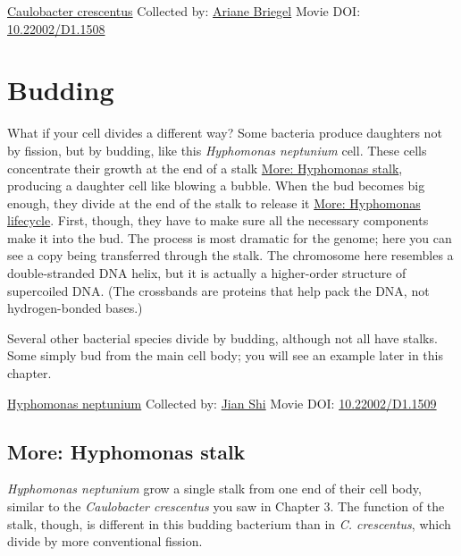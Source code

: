 \documentclass[]{tufte-book}
\begin{document}
\hypertarget{htmlwidget-33786a31876148ad20f7}{}

\label{fig:5-2}\protect\hyperlink{tree}{Caulobacter crescentus} Collected by: \protect\hyperlink{ariane_briegel}{Ariane Briegel} Movie DOI: \href{https://doi.org/10.22002/D1.1508}{10.22002/D1.1508}

\hypertarget{budding}{%
\section{Budding}\label{budding}}

What if your cell divides a different way? Some bacteria produce daughters not by fission, but by budding, like this \emph{Hyphomonas neptunium} cell. These cells concentrate their growth at the end of a stalk \protect\hyperlink{Hyphomonas_stalk}{More: Hyphomonas stalk}, producing a daughter cell like blowing a bubble. When the bud becomes big enough, they divide at the end of the stalk to release it \protect\hyperlink{Hyphomonas_lifecycle}{More: Hyphomonas lifecycle}. First, though, they have to make sure all the necessary components make it into the bud. The process is most dramatic for the genome; here you can see a copy being transferred through the stalk. The chromosome here resembles a double-stranded DNA helix, but it is actually a higher-order structure of supercoiled DNA. (The crossbands are proteins that help pack the DNA, not hydrogen-bonded bases.)

Several other bacterial species divide by budding, although not all have stalks. Some simply bud from the main cell body; you will see an example later in this chapter.



\hypertarget{htmlwidget-0e4afeec672d46a54c97}{}

\label{fig:5-3}\protect\hyperlink{tree}{Hyphomonas neptunium} Collected by: \protect\hyperlink{jian_shi}{Jian Shi} Movie DOI: \href{https://doi.org/10.22002/D1.1509}{10.22002/D1.1509}

\hypertarget{Hyphomonas_stalk}{%
\subsection*{More: Hyphomonas stalk}\label{Hyphomonas_stalk}}

\emph{Hyphomonas neptunium} grow a single stalk from one end of their cell body, similar to the \emph{Caulobacter crescentus} you saw in Chapter 3. The function of the stalk, though, is different in this budding bacterium than in \emph{C. crescentus}, which divide by more conventional fission.
\end{document}
